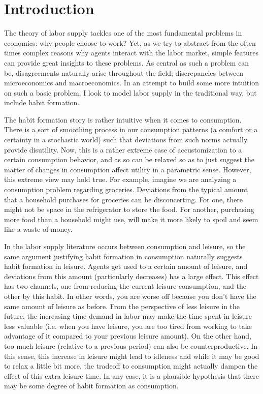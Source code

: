 \documentclass[ProjectMMD]{subfiles}
\begin{document}
{\titlepagefinish}

\hypertarget{Introduction}{}
\section{Introduction}\label{sec:intro}

The theory of labor supply tackles one of the most fundamental problems in economics: why people choose to work? Yet, as we try to abstract from the often times complex reasons why agents interact with the labor market, simple features can provide great insights to these problems. As central as such a problem can be, disagreements naturally arise throughout the field; discrepancies between microeconomics and macroeconomics. In an attempt to build some more intuition on such a basic problem, I look to model labor supply in the traditional way, but include habit formation.

The habit formation story is rather intuitive when it comes to consumption. There is a sort of smoothing process in our consumption patterns (a comfort or a certainty in a stochastic world) such that deviations from such norms actually provide disutility. Now, this is a rather extreme case of accustomization to a certain consumption behavior, and as so can be relaxed so as to just suggest the matter of changes in consumption affect utility in a parametric sense. However, this extreme view may hold true. For example, imagine we are analyzing a consumption problem regarding groceries. Deviations from the typical amount that a household purchases for groceries can be disconcerting. For one, there might not be space in the refrigerator to store the food. For another, purchasing more food than a household might use, will make it more likely to spoil and seem like a waste of money. 

In the labor supply literature occurs between consumption and leisure, so the same argument justifying habit formation in consumption naturally suggests habit formation in leisure. Agents get used to a certain amount of leisure, and deviations from this amount (particularly decreases) has a large effect. This effect has two channels, one from reducing the current leisure consumption, and the other by this habit. In other words, you are worse off because you don't have the same amount of leisure as before. From the perspective of less leisure in the future, the increasing time demand in labor may make the time spent in leisure less valuable (i.e. when you have leisure, you are too tired from working to take advantage of it compared to your previous leisure amount). On the other hand, too much leisure (relative to a previous period) can also be counterproductive. In this sense, this increase in leisure might lead to idleness and while it may be good to relax a little bit more, the tradeoff to consumption might actually dampen the effect of this extra leisure time. In any case, it is a plausible hypothesis that there may be some degree of habit formation as consumption.
\end{document}
